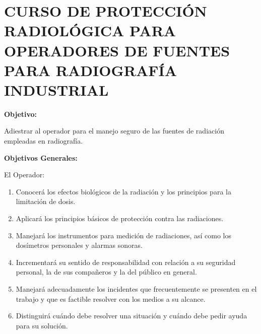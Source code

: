 \section{CURSO DE PROTECCIÓN RADIOLÓGICA PARA OPERADORES DE FUENTES PARA RADIOGRAFÍA INDUSTRIAL}

\textbf{Objetivo:}

Adiestrar al operador para el manejo seguro de las fuentes de radiación empleadas en radiografía.

\textbf{Objetivos Generales:}

El Operador:

\begin{enumerate}
    \item Conocerá los efectos biológicos de la radiación y los principios para la limitación de dosis.
    \item Aplicará los principios básicos de protección contra las radiaciones.
    \item Manejará los instrumentos para medición de radiaciones, así como los dosímetros personales y alarmas sonoras.
    \item Incrementará su sentido de responsabilidad con relación a su seguridad personal, la de sus compañeros y la del público en general.
    \item Manejará adecuadamente los incidentes que frecuentemente se presenten en el trabajo y que es factible resolver con los medios a su alcance.
    \item Distinguirá cuándo debe resolver una situación y cuándo debe pedir ayuda para su solución.
\end{enumerate}